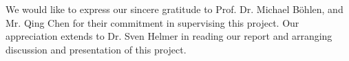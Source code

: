 We would like to express our sincere gratitude to Prof. Dr. Michael Böhlen, and Mr. Qing Chen for their commitment in supervising this project. Our appreciation extends to Dr. Sven Helmer in reading our report and arranging discussion and presentation of this project.